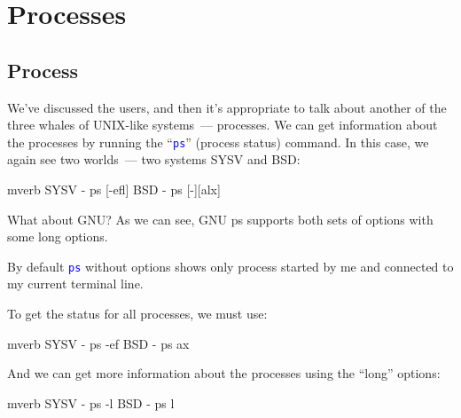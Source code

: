 \documentclass[12pt]{report}
\newcommand{\cmd}[1]{\textcolor{blue}{\tt #1}}
\begin{document}
\section*{Processes}

\subsection*{Process}

We've discussed the users, and then it's appropriate to talk about
another of the three whales of UNIX-like systems~--- processes. We can get
information about the processes by running the ``\cmd{ps}'' (process status)
command. In this case, we again see two worlds~--- two systems SYSV and BSD:
\begin{code}{mverb}
SYSV - ps [-efl]
BSD - ps [-][alx]
\end{code}

What about GNU? As we can see, GNU ps supports both sets of options with
some long options.

By default \cmd{ps} without options shows only process started by me and
connected to my current terminal line.

To get the status for all processes, we must use:
\begin{code}{mverb}
SYSV - ps -ef
BSD - ps ax
\end{code}

And we can get more information about the processes using the ``long'' options:
\begin{code}{mverb}
SYSV - ps -l
BSD - ps l
\end{code}
\end{document}
